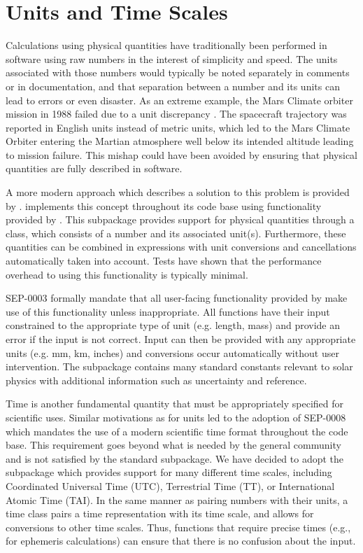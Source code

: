 \section{Units and Time Scales}
\label{sec:units}

Calculations using physical quantities have traditionally been performed in software using raw numbers in the interest of simplicity and speed.
The units associated with those numbers would typically be noted separately in comments or in documentation, and that separation between a number and its units can lead to errors or even disaster.
As an extreme example, the Mars Climate orbiter mission in 1988 failed due to a unit discrepancy \citep{mco_mishap_report}.
The spacecraft trajectory was reported in English units instead of metric units, which led to the Mars Climate Orbiter entering the Martian atmosphere well below its intended altitude leading to mission failure.
This mishap could have been avoided by ensuring that physical quantities are fully described in software.

A more modern approach which describes a solution to this problem is provided by \citet{Damevski2009}.
\sunpypkg implements this concept throughout its code base using  functionality provided by .
This subpackage provides support for physical quantities through a class, which consists of a number and its associated unit(s).
Furthermore, these quantities can be combined in expressions with unit conversions and cancellations automatically taken into account.
Tests have shown that the performance overhead to using this functionality is typically minimal.

SEP-0003 \citep{sep-0003} formally mandate that all user-facing functionality provided by \sunpypkg make use of this functionality unless inappropriate.
All functions have their input constrained to the appropriate type of unit (e.g. length, mass) and provide an error if the input is not correct.
Input can then be provided with any appropriate units (e.g. mm, km, inches) and conversions occur automatically without user intervention.
The  subpackage contains many standard constants relevant to solar physics with additional information such as uncertainty and reference.

Time is another fundamental quantity that must be appropriately specified for scientific uses.
Similar motivations as for units led to the adoption of SEP-0008 \citep{sep-0008} which mandates the use of a modern scientific time format throughout the \sunpypkg code base.
This requirement goes beyond what is needed by the general \python community and is not satisfied by the standard  subpackage.
We have decided to adopt the  subpackage which provides support for many different time scales, including Coordinated Universal Time (UTC), Terrestrial Time (TT), or International Atomic Time (TAI).
In the same manner as pairing numbers with their units, a time class pairs a time representation with its time scale, and allows for conversions to other time scales.
Thus, functions that require precise times (e.g., for ephemeris calculations) can ensure that there is no confusion about the input.
